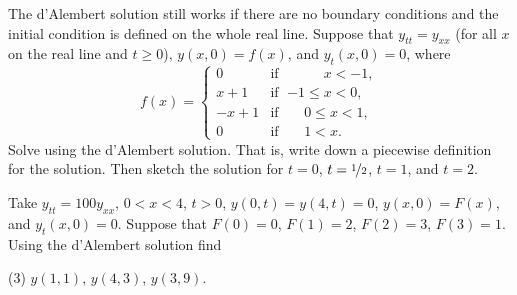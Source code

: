 \begin{exercise}
The d'Alembert solution still works if there are no boundary conditions and
the initial condition is defined on the whole real line.  Suppose that
$y_{tt} = y_{xx}$ (for all $x$ on the real line and $t \geq 0$),
$y(x,0) = f(x)$, and
$y_t(x,0) = 0$, where
\begin{equation*}
f(x) =
\begin{cases}
0 & \text{if } \; \phantom{{-1} \leq {} }x < -1, \\
x+1 & \text{if } \; {-1} \leq x < 0, \\
-x+1 & \text{if } \; \phantom{-}0 \leq x < 1, \\
0 & \text{if } \; \phantom{-}1 < x .
\end{cases}
\end{equation*}
Solve using the d'Alembert solution. That is, write down a piecewise
definition for the solution.  Then sketch the solution for $t=0$,
$t=\nicefrac{1}{2}$, $t=1$, and $t=2$.
\end{exercise}

\begin{exercise}\ansMark%
Take $y_{tt} = 100y_{xx}$, $0 < x < 4$, $t > 0$,
$y(0,t) = y(4, t) = 0$, $y(x,0) = F(x)$, and
$y_t(x,0) = 0$.  Suppose that
$F(0)=0$,
$F(1)=2$,
$F(2)=3$,
$F(3)=1$.
Using the d'Alembert solution find
\begin{tasks}(3)
\task $y(1,1)$,
\task $y(4,3)$,
\task $y(3,9)$.
\end{tasks}
\end{exercise}

\setcounter{exercise}{100}

